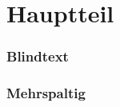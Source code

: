 \documentclass[12pt,ngerman]{beamer}
\begin{document}
\section{Hauptteil}

\begin{frame}
\frametitle{Blindtext}

\blindtext

\end{frame}

\begin{frame}
\frametitle{Mehrspaltig}

\begin{columns}
\begin{column}{0.33\textwidth}
\tiny\blindtext
\end{column}
\begin{column}{0.33\textwidth}
\tiny\blindtext
\end{column}
\begin{column}{0.33\textwidth}
\tiny\blindtext
\end{column}
\end{columns}


\end{frame}
\end{document}
